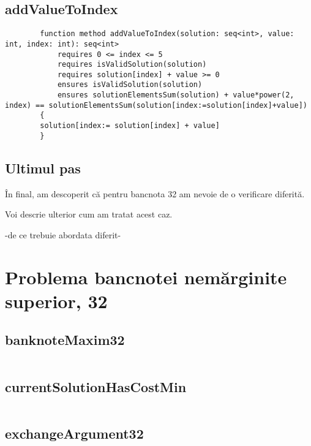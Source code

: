     \subsection{addValueToIndex}
    \begin{lstlisting}
        function method addValueToIndex(solution: seq<int>, value: int, index: int): seq<int>
            requires 0 <= index <= 5
            requires isValidSolution(solution)
            requires solution[index] + value >= 0
            ensures isValidSolution(solution)
            ensures solutionElementsSum(solution) + value*power(2, index) == solutionElementsSum(solution[index:=solution[index]+value])
        {
        solution[index:= solution[index] + value]
        }
    \end{lstlisting}

    
    \subsection{Ultimul pas}
    În final, am descoperit că pentru bancnota 32 am nevoie de o verificare diferită.\par
    Voi descrie ulterior cum am tratat acest caz.\par
    -de ce trebuie abordata diferit- 
    
    
    
\section{Problema bancnotei nemărginite superior, 32}
\subsection{banknoteMaxim32}
\begin{lstlisting}
\end{lstlisting}

\subsection{currentSolutionHasCostMin}
\begin{lstlisting}
\end{lstlisting}


\subsection{exchangeArgument32}
\begin{lstlisting}
\end{lstlisting}

